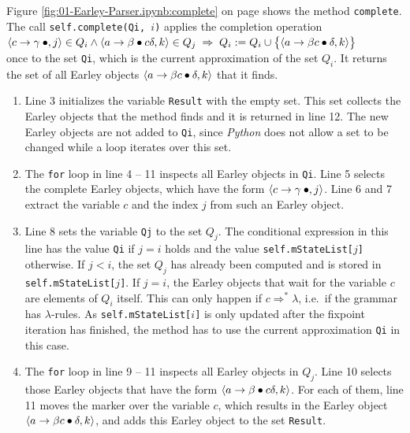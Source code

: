 \noindent
Figure \ref{fig:01-Earley-Parser.ipynb:complete} on page \pageref{fig:01-Earley-Parser.ipynb:complete} shows the
method \texttt{complete}.  The call \texttt{self.complete(Qi,~$i$)} applies the completion operation
\\[0.2cm]
\hspace*{1.3cm}
$\pair(c \rightarrow \gamma \mdot, j) \in Q_i \wedge
 \pair(a \rightarrow \beta \mdot c \delta,k) \in Q_j \;\Rightarrow\;
 Q_i := Q_i \cup \bigl\{ \pair(a \rightarrow \beta c \mdot \delta,k) \bigr\}$
\\[0.2cm]
once to the set \texttt{Qi}, which is the current approximation of the set $Q_i$.  It returns the set of all Earley
objects $\pair(a \rightarrow \beta c \mdot \delta,k)$ that it finds.
\begin{enumerate}
\item Line 3 initializes the variable \texttt{Result} with the empty set.  This set collects the Earley objects
      that the method finds and it is returned in line 12.  The new Earley objects are not added to \texttt{Qi},
      since \textsl{Python} does not allow a set to be changed while a loop iterates over this set.
\item The \texttt{for} loop in line 4 -- 11 inspects all Earley objects in \texttt{Qi}.  Line 5 selects the complete
      Earley objects, which have the form $\pair(c \rightarrow \gamma \mdot, j)$.  Line 6 and 7 extract the variable
      $c$ and the index $j$ from such an Earley object.
\item Line 8 sets the variable \texttt{Qj} to the set $Q_j$.  The conditional expression in this line has the value
      \texttt{Qi} if $j = i$ holds and the value \texttt{self.mStateList[$j$]} otherwise.  If $j < i$, the set
      $Q_j$ has already been computed and is stored in \texttt{self.mStateList[$j$]}.  If $j = i$, the Earley
      objects that wait for the variable $c$ are elements of $Q_i$ itself.  This can only happen if
      $c \Rightarrow^* \lambda$, i.e.~if the grammar has $\lambda$-rules.  As \texttt{self.mStateList[$i$]} is only
      updated after the fixpoint iteration has finished, the method has to use the current approximation
      \texttt{Qi} in this case.
\item The \texttt{for} loop in line 9 -- 11 inspects all Earley objects in $Q_j$.  Line 10 selects those Earley
      objects that have the form $\pair(a \rightarrow \beta \mdot c \delta, k)$.  For each of them, line 11 moves
      the marker over the variable $c$, which results in the Earley object
      $\pair(a \rightarrow \beta c \mdot \delta, k)$, and adds this Earley object to the set \texttt{Result}.
\end{enumerate}


